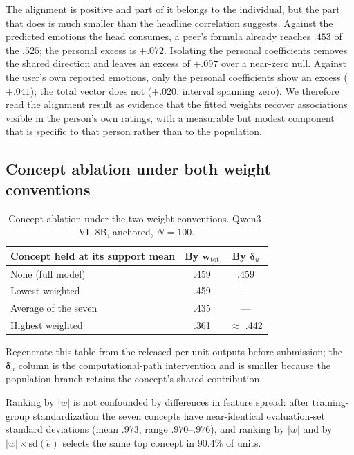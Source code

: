 The alignment is positive and part of it belongs to the individual, but the
part that does is much smaller than the headline correlation suggests. Against
the predicted emotions the head consumes, a peer's formula already reaches
$.453$ of the $.525$; the personal excess is $+.072$. Isolating the personal
coefficients removes the shared direction and leaves an excess of $+.097$ over
a near-zero null. Against the user's own reported emotions, only the personal
coefficients show an excess ($+.041$); the total vector does not
($+.020$, interval spanning zero). We therefore read the alignment result as
evidence that the fitted weights recover associations visible in the person's
own ratings, with a measurable but modest component that is specific to that
person rather than to the population.

\subsection{Concept ablation under both weight conventions}

\begin{table}[t]
\centering
\begin{threeparttable}
\caption{Concept ablation under the two weight conventions. Qwen3-VL 8B,
anchored, $N=100$.}
\label{tab:ablation_both}
\small
\setlength{\tabcolsep}{5pt}
\begin{tabular}{lcc}
\toprule
Concept held at its support mean & By $\mathbf w_{\mathrm{tot}}$ & By $\boldsymbol\delta_u$ \\
\midrule
None (full model)   & .459 & .459 \\
Lowest weighted     & .459 & --- \\
Average of the seven& .435 & --- \\
Highest weighted    & .361 & $\approx$ .442 \\
\bottomrule
\end{tabular}
\begin{tablenotes}[flushleft]\footnotesize
\item Regenerate this table from the released per-unit outputs before
submission; the $\boldsymbol\delta_u$ column is the computational-path
intervention and is smaller because the population branch retains the
concept's shared contribution.
\item Ranking by $\lvert w\rvert$ is not confounded by differences in feature
spread: after training-group standardization the seven concepts have
near-identical evaluation-set standard deviations (mean $.973$, range
$.970$--$.976$), and ranking by $\lvert w\rvert$ and by
$\lvert w\rvert\times\mathrm{sd}(\hat e)$ selects the same top concept in
$90.4\%$ of units.
\end{tablenotes}
\end{threeparttable}
\end{table}

